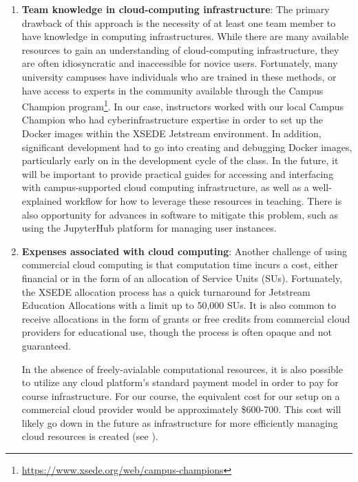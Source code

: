 \begin{enumerate}

\item {\bf Team knowledge in cloud-computing infrastructure}: The primary drawback of
this approach is the necessity of at least one team member to have knowledge
in computing infrastructures. While there are many available resources to gain an
understanding of cloud-computing infrastructure, they are often idiosyncratic and
inaccessible for novice users. Fortunately, many university campuses
have individuals who are trained in these methods, or have access to experts in
the community available through the Campus Champion program\footnote{\url{https://www.xsede.org/web/campus-champions}}.
In our case, instructors worked with our local Campus Champion who had
cyberinfrastructure expertise in order to set up the Docker images within
the XSEDE Jetstream environment. In addition, significant development had to go
into creating and debugging Docker images, particularly early on in the
development cycle of the class. In the future, it will be important to provide
practical guides for accessing and interfacing with campus-supported cloud computing infrastructure, as
well as a well-explained workflow for how to leverage these resources in
teaching. There is also opportunity for advances in software to mitigate this
problem, such as using the JupyterHub \cite{perez2015project} platform
for managing user instances.

\item {\bf Expenses associated with cloud computing}: Another challenge of using
commercial cloud computing is that computation time incurs a cost, either
financial or in the form of an allocation of Service Units (SUs).
Fortunately, the XSEDE allocation process has a quick
turnaround for Jetstream Education Allocations with a limit up to 50,000 SUs.
It is also common to receive allocations in the form of grants or free credits
from commercial cloud providers for educational use, though the process is often
opaque and not guaranteed.

In the absence of freely-avialable computational resources, it is also
possible to utilize any cloud platform's standard payment model in order
to pay for course infrastructure. For our course, the equivalent cost
for our setup on a commercial cloud provider would be approximately \$600-700.
This cost will likely go down in the future as infrastructure for more efficiently
managing cloud resources is created (see \cite{perez2015project}).


\end{enumerate}

